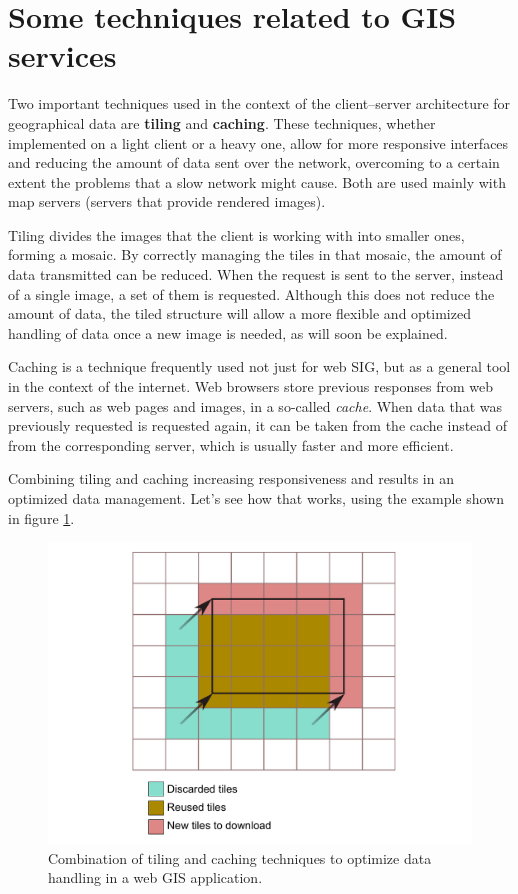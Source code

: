 \section{Some techniques related to GIS services}

Two important techniques used in the context of the client--server architecture for geographical data are \textbf{tiling} and \textbf{caching}. These techniques, whether implemented on a light client or a heavy one, allow for more responsive interfaces and reducing the amount of data sent over the network, overcoming to a certain extent the problems that a slow network might cause. Both are used mainly with map servers (servers that provide rendered images).

Tiling divides the images that the client is working with into smaller ones, forming a mosaic. By correctly managing the tiles in that mosaic, the amount of data transmitted can be reduced. When the request is sent to the server, instead of a single image, a set of them is requested. Although this does not reduce the amount of data, the tiled structure will allow a more flexible and optimized handling of data once a new image is needed, as will soon be explained.

Caching is a technique frequently used not just for web SIG, but as a general tool in the context of the internet. Web browsers store previous responses from web servers, such as web pages and images, in a so-called \emph{cache}. When data that was previously requested is requested again, it can be taken from the cache instead of from the corresponding server, which is usually faster and more efficient.

Combining tiling and caching increasing responsiveness and results in an optimized data management. Let's see how that works, using the example shown in figure \ref{Fig:Tiling}.

\begin{figure}[!hbt]   
\centering
\includegraphics[width=\textwidth]{Software/Tiling.pdf}
\caption{\small Combination of tiling and caching techniques to optimize data handling in a web GIS application.}
\label{Fig:Tiling} 
\end{figure}

